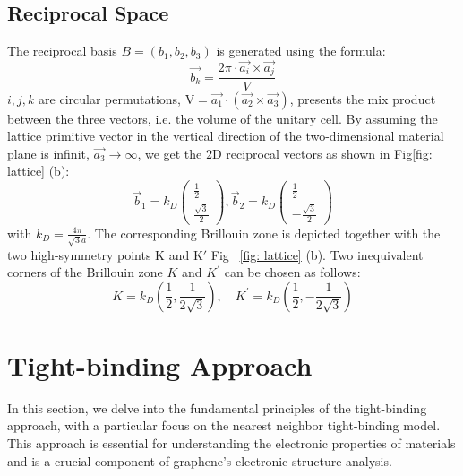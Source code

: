 \subsection{Reciprocal Space}
The reciprocal basis $B=\left(b_{1}, b_{2}, b_{3}\right)$ is generated using the formula:
$$
	\overrightarrow{b_{k}}=\frac{2 \pi \cdot \overrightarrow{a_{i}} \times \overrightarrow{a_{j}}}{V}
$$
$i, j, k$ are circular permutations, $\mathrm{V}=\overrightarrow{a_{1}}\cdot (\overrightarrow{a_{2}}
	\times \overrightarrow{a_3})$, presents the mix product between the three vectors, i.e. the volume
of the unitary cell.  By assuming the lattice primitive vector in the vertical direction of the
two-dimensional material plane is infinit, $\overrightarrow{a_{3}}\to\infty$, we get the $2 \mathrm{D}$ reciprocal vectors as shown in Fig\ref{fig: lattice} (b):
$$
	\vec b_{1}=k_{D}\left(\begin{array}{l}
			\frac{1}{2} \\
			\frac{\sqrt{3}}{2}
		\end{array}\right),
	\vec b_{2}=k_{D}\left(\begin{array}{c}
			\frac{1}{2} \\
			-\frac{\sqrt{3}}{2}
		\end{array}\right)
$$
with $k_{D}=\frac{4 \pi}{\sqrt{3} a}$. The corresponding Brillouin zone is depicted together with the two high-symmetry points $\mathrm{K}$ and $\mathrm{K'}$ Fig ~\ref{fig: lattice} (b).
Two inequivalent corners of the Brillouin zone $K$ and $K^{\prime}$ can be chosen as follows:
$$
	K=k_{D}\left(\frac{1}{2}, \frac{1}{2 \sqrt{3}}\right), \quad K^{\prime}=k_{D}\left(\frac{1}{2},-\frac{1}{2 \sqrt{3}}\right)
$$

\section{Tight-binding Approach \label{sec:tightbinding}}

In this section, we delve into the fundamental principles of the tight-binding approach, with a particular focus on the nearest neighbor tight-binding model. This approach is essential for understanding the electronic properties of materials and is a crucial component of graphene's electronic structure analysis.

